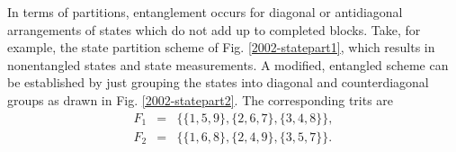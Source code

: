 In terms of partitions, entanglement occurs for diagonal
or antidiagonal arrangements of states
which do not add up to completed blocks.
Take, for example, the state partition scheme of Fig. \ref{2002-statepart1},
which results in nonentangled states and state measurements.
A modified, entangled scheme can be established by just grouping the states
into diagonal and counterdiagonal groups as drawn in Fig.
\ref{2002-statepart2}.
The corresponding trits are
\begin{equation}
\begin{array}{llll}
F_1&=&\{\{1,5,9\},\{2,6,7\},\{3,4,8\}\},\\
F_2&=&\{\{1,6,8\},\{2,4,9\},\{3,5,7\}\}.\\
\end{array}
\label{2002-statepart-ps3eentan}
\end{equation}
